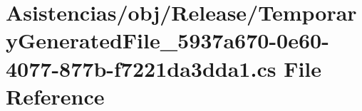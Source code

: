\hypertarget{_asistencias_2obj_2_release_2_temporary_generated_file__5937a670-0e60-4077-877b-f7221da3dda1_8cs}{\section{Asistencias/obj/\-Release/\-Temporary\-Generated\-File\-\_\-5937a670-\/0e60-\/4077-\/877b-\/f7221da3dda1.cs File Reference}
\label{_asistencias_2obj_2_release_2_temporary_generated_file__5937a670-0e60-4077-877b-f7221da3dda1_8cs}
}
